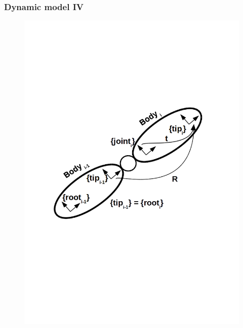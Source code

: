\documentclass{beamer}
\begin{document}
\begin{frame}
	\frametitle{Dynamic model IV}
	\vspace{-0.7cm}
	\begin{figure}
\centering
\begin{minipage}{.4\textwidth}
  \centering
  \vspace{-0.5cm}
  \includegraphics[trim=0 100 0 220,width=1.1\linewidth]{images/kdl_rigidbodyi}
\end{minipage}
\begin{minipage}{.4\textwidth}
  \centering
\vspace{-2cm}
  \vspace{-0.5cm}

\end{minipage}
\end{figure}
\end{frame}
\end{document}
